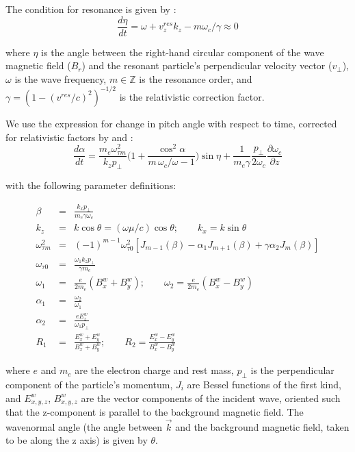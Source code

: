 The condition for resonance is given by \cite{Chang1983a}:
\begin{equation}
\frac{d \eta}{dt} = \omega + v_z^{res} k_z - m \omega_c / \gamma \approx 0
\end{equation}

where $\eta$ is the angle between the right-hand circular component of the wave magnetic field ($B_r$) and the resonant particle's perpendicular velocity vector ($v_\perp$), $\omega$ is the wave frequency, $m \in \mathbb Z$ is the resonance order, and $\gamma = (1 - (v^{res}/c)^2)^{-1/2}$ is the relativistic correction factor.

We use the \cite{Bell1984} expression for change in pitch angle with respect to time, corrected for relativistic factors by \cite{Ristic1993} and \cite{Bortnik2006}:
\begin{equation}
\frac{d\alpha}{dt} = \frac{m_e \omega_{\tau m}^2}{k_z p_\perp} \bigg( 1 + \frac{\cos^2\alpha}{m\,\omega_c / \omega - 1}\bigg)\sin \eta + \frac{1}{m_e \gamma}\frac{p_\perp}{2 \omega_c}\frac{\partial \omega_c}{\partial z}
\label{eqn:bell_dadt}
\end{equation}

with the following parameter definitions:

\begin{eqnarray}
\beta & = &\frac{k_x p_\perp}{m_e \gamma \omega_c} \\
k_z & = & k \cos \theta = (\omega \mu / c) \cos \theta; \qquad k_x = k \sin \theta \\
\omega_{\tau m}^2 & = & (-1)^{m-1}\omega_{\tau 0}^2 [J_{m-1}(\beta) - \alpha_1 J_{m+1}(\beta) + \gamma \alpha_2 J_m(\beta)] \\
\omega_{\tau 0} & = & \frac{\omega_1 k_z p_\perp}{\gamma m_e} \\
\omega_1 & = & \frac{e}{2 m_e} (B_x^w + B_y^w); \qquad \omega_2 = \frac{e}{2 m_e}(B_x^w - B_y^w) \\
\alpha_1 & = & \frac{\omega_2}{\omega_1} \\
\alpha_2 & = & \frac{e E_z^w}{\omega_1 p_\perp} \\
R_1 & = & \frac{E_x^w + E_y^w}{B_x^w + B_y^w}; \qquad R_2 =  \frac{E_x^w - E_y^w}{B_x^w - B_y^w}
\label{eqn:dadt_subparams}
\end{eqnarray}

where $e$ and $m_e$ are the electron charge and rest mass, $p_\perp$ is the perpendicular component of the particle's momentum, $J_i$ are Bessel functions of the first kind, and $E_{x,y,z}^w$, $B_{x,y,z}^w$ are the vector components of the incident wave, oriented such that the z-component is parallel to the background magnetic field. The wavenormal angle (the angle between $\vec{k}$ and the background magnetic field, taken to be along the z axis) is given by $\theta$.

